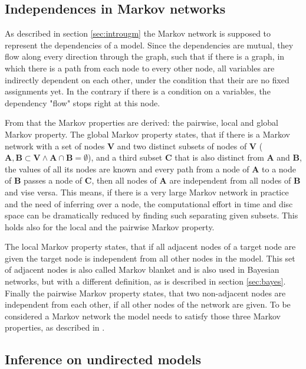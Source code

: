 \subsection{Independences in Markov networks} \label{sec:indep}

As described in section \ref{sec:introugm} the Markov network is supposed to represent the dependencies of a model. Since the dependencies are mutual, they flow along every direction through the graph, such that if there is a graph, in which there is a path from each node to every other node, all variables are indirectly dependent on each other, under the condition that their are no fixed assignments yet. In the contrary if there is a condition on a variables, the dependency "flow" stops right at this node.

From that the Markov properties are derived: the pairwise, local and global Markov property. The global Markov property states, that if there is a Markov network with a set of nodes $\mathbf{V}$ and two distinct subsets of nodes of $\mathbf{V}$ ($\mathbf{A}, \mathbf{B} \subset \mathbf{V} \wedge \mathbf{A} \cap \mathbf{B} = \emptyset$), and a third subset $\mathbf{C}$ that is also distinct from $\mathbf{A}$ and $\mathbf{B}$, the values of all its nodes are known and every path from a node of $\mathbf{A}$ to a node of $\mathbf{B}$ passes a node of $\mathbf{C}$, then all nodes of $\mathbf{A}$ are independent from all nodes of $\mathbf{B}$ and vise versa. This means, if there is a very large Markov network in practice and the need of inferring over a node, the computational effort in time and disc space can be dramatically reduced by finding such separating given subsets. This holds also for the local and the pairwise Markov property.

The local Markov property states, that if all adjacent nodes of a target node are given the target node is independent from all other nodes in the model. This set of adjacent nodes is also called Markov blanket and is also used in Bayesian networks, but with a different definition, as is described in section \ref{sec:bayes}. Finally the pairwise Markov property states, that two non-adjacent nodes are independent from each other, if all other nodes of the network are given. To be considered a Markov network the model needs to satisfy those three Markov properties, as described in \cite{markov1957theory}.


\subsection{Inference on undirected models} \label{sec:infer}


